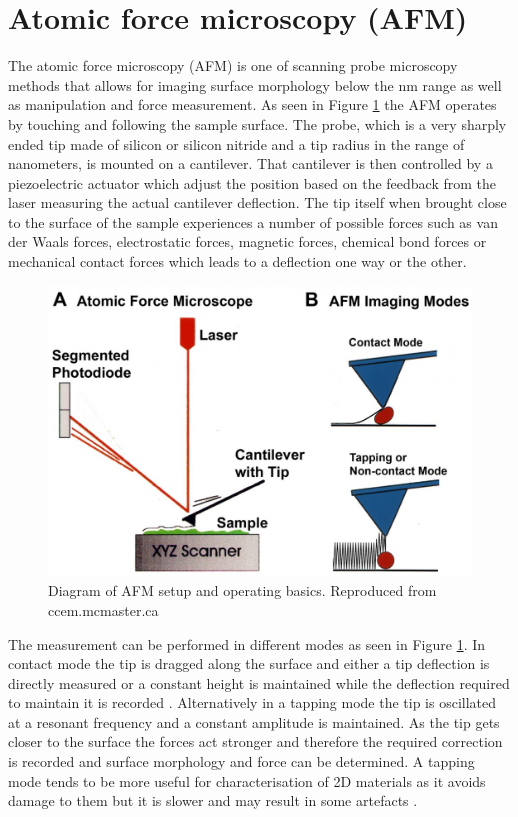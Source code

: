 \section{Atomic force microscopy (AFM)}

The atomic force microscopy (AFM) is one of scanning probe microscopy methods that allows for imaging surface morphology below the nm range as well as manipulation and force measurement. As seen in Figure \ref{fig:MethodologyAFMSetup} the AFM operates by touching and following the sample surface. The probe, which is a very sharply ended tip made of silicon or silicon nitride and a tip radius in the range of nanometers, is mounted on a cantilever. That cantilever is then controlled by a piezoelectric actuator which adjust the position based on the feedback from the laser measuring the actual cantilever deflection. The tip itself when brought close to the surface of the sample experiences a number of possible forces such as van der Waals forces, electrostatic forces, magnetic forces, chemical bond forces or mechanical contact forces which leads to a deflection one way or the other.

\begin{figure}[H]
	\begin{center}
		\includegraphics[scale=0.3]{Methodology/AFMSetup.png}
		\caption{Diagram of AFM setup and operating basics. Reproduced from ccem.mcmaster.ca}
		\label{fig:MethodologyAFMSetup}
	\end{center}
\end{figure}

The measurement can be performed in different modes as seen in Figure \ref{fig:MethodologyAFMSetup}. In contact mode the tip is dragged along the surface and either a tip deflection is directly measured or a constant height is maintained while the deflection required to maintain it is recorded \cite{Binnig1993}. Alternatively in a tapping mode the tip is oscillated at a resonant frequency and a constant amplitude is maintained. As the tip gets closer to the surface the forces act stronger and therefore the required correction is recorded and surface morphology and force can be determined. A tapping mode tends to be more useful for characterisation of 2D materials as it avoids damage to them but it is slower and may result in some artefacts \cite{Schmitz1997}.

